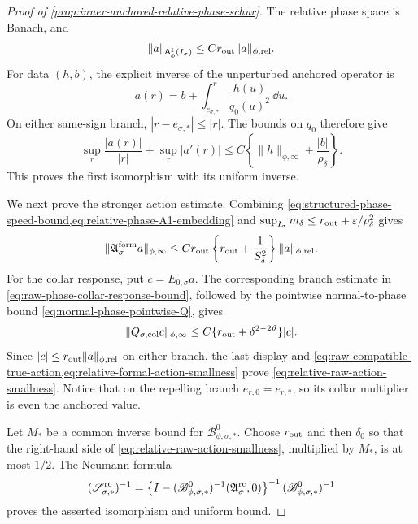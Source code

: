 \begin{proof}[Proof of
\cref{prop:inner-anchored-relative-phase-schur}]
The relative phase space is Banach, and
\begin{equation}
 \|a\|_{\mathsf A_\phi^1(I_\sigma)}
 \le Cr_{\rm out}\|a\|_{\phi,\mathrm{rel}}.        \label{eq:relative-phase-A1-embedding}
\end{equation}
For data \((h,b)\), the explicit inverse of the unperturbed anchored
operator is
\begin{equation}
 a(r)=b+\int_{e_{\sigma,*}}^r\frac{h(u)}{q_0(u)^2}\,\dd u.   \label{eq:inner-anchored-linear-explicit-inverse}
\end{equation}
On either same-sign branch,
\(|r-e_{\sigma,*}|\le |r|\).  The bounds on \(q_0\) therefore give
\[
 \sup_r\frac{|a(r)|}{|r|}+\sup_r|a'(r)|
 \le C\left\{\|h\|_{\phi,\infty}
                  +\frac{|b|}{\rho_\delta}\right\}.
\]
This proves the first isomorphism with its uniform inverse.

We next prove the stronger action estimate.  Combining
\cref{eq:structured-phase-speed-bound,eq:relative-phase-A1-embedding}
and
\(\sup_{I_\sigma}m_\delta
 \le r_{\rm out}+\varepsilon/\rho_\delta^2\)
gives
\begin{equation}
 \|\mathfrak A_\sigma^{\rm form}a\|_{\phi,\infty}
 \le Cr_{\rm out}\left\{
       r_{\rm out}+\frac1{S_\delta^2}\right\}
       \|a\|_{\phi,\mathrm{rel}}.                 \label{eq:relative-formal-action-smallness}
\end{equation}
For the collar response, put \(c=E_{0,\sigma}a\).  The corresponding
branch estimate in \cref{eq:raw-phase-collar-response-bound}, followed by
the pointwise normal-to-phase bound
\cref{eq:normal-phase-pointwise-Q}, gives
\[
 \|Q_{\sigma,\rm col}c\|_{\phi,\infty}
 \le C\{r_{\rm out}+\delta^{2-2\vartheta}\}|c|.
\]
Since \(|c|\le r_{\rm out}\|a\|_{\phi,\mathrm{rel}}\) on either branch,
the last display and
\cref{eq:raw-compatible-true-action,eq:relative-formal-action-smallness}
prove \cref{eq:relative-raw-action-smallness}.  Notice that on the
repelling branch \(e_{r,0}=e_{r,*}\), so its collar multiplier is even the
anchored value.

Let \(M_*\) be a common inverse bound for
\(\mathscr B_{\phi,\sigma,*}^0\).  Choose \(r_{\rm out}\) and then
\(\delta_0\) so that the right-hand side of
\cref{eq:relative-raw-action-smallness}, multiplied by \(M_*\), is at most
\(1/2\).  The Neumann formula
\begin{equation}
 (\mathscr S_{\sigma,*}^{\rm rc})^{-1}
 =\left\{I-(\mathscr B_{\phi,\sigma,*}^0)^{-1}
       (\mathfrak A_\sigma^{\rm rc},0)\right\}^{-1}
       (\mathscr B_{\phi,\sigma,*}^0)^{-1}         \label{eq:inner-anchored-schur-neumann}
\end{equation}
proves the asserted isomorphism and uniform bound.


\end{proof}
